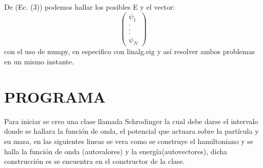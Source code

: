 \documentclass[9pt,twocolumn,twoside]{osajnl}
\begin{document}
De (Ec. (3)) podemos hallar los posibles E y el vector: $$\begin{pmatrix}
\psi_1 \\
.\\
.\\
.\\
\psi_N
\end{pmatrix}$$ con el uso de numpy, en especifico con linalg.eig y así resolver ambos problemas en un mismo instante.

\section{PROGRAMA}

Para iniciar se creo una clase llamada Schrodinger la cual debe darse el intervalo donde se hallara la función de onda, el potencial que actuara sobre la partícula y su masa, en las siguientes lineas se vera como se construye el hamiltoniano y se halla la función de onda (autovalores) y la energía(autovectores), dicha construcción es se encuentra en el constructor de la clase.
\end{document}
